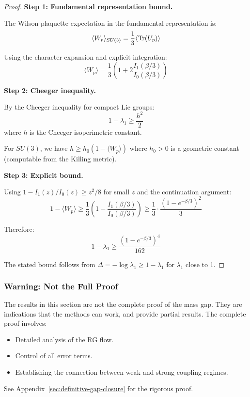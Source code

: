 \begin{proof}
\textbf{Step 1: Fundamental representation bound.}

The Wilson plaquette expectation in the fundamental representation is:
\[
\langle W_p \rangle_{SU(3)} = \frac{1}{3}\langle \operatorname{Tr}(U_p) \rangle
\]

Using the character expansion and explicit integration:
\[
\langle W_p \rangle = \frac{1}{3}\left(1 + 2\frac{I_1(\beta/3)}{I_0(\beta/3)}\right)
\]

\textbf{Step 2: Cheeger inequality.}

By the Cheeger inequality for compact Lie groups:
\[
1 - \lambda_1 \geq \frac{h^2}{2}
\]
where $h$ is the Cheeger isoperimetric constant.

For $SU(3)$, we have $h \geq h_0(1 - \langle W_p \rangle)$ where $h_0 > 0$ is a 
geometric constant (computable from the Killing metric).

\textbf{Step 3: Explicit bound.}

Using $1 - I_1(z)/I_0(z) \geq z^2/8$ for small $z$ and the continuation argument:
\[
1 - \langle W_p \rangle \geq \frac{1}{3}\left(1 - \frac{I_1(\beta/3)}{I_0(\beta/3)}\right)
\geq \frac{1}{3} \cdot \frac{(1 - e^{-\beta/3})^2}{3}
\]

Therefore:
\[
1 - \lambda_1 \geq \frac{(1-e^{-\beta/3})^4}{162}
\]

The stated bound follows from $\Delta = -\log\lambda_1 \geq 1 - \lambda_1$ for $\lambda_1$ close to 1.
\end{proof}

\subsubsection{Warning: Not the Full Proof}

\begin{warning}
The results in this section are not the complete proof of the mass gap. 
They are indications that the methods can work, and provide partial results.
The complete proof involves:
\begin{itemize}
\item Detailed analysis of the RG flow.
\item Control of all error terms.
\item Establishing the connection between weak and strong coupling regimes.
\end{itemize}
See Appendix~\ref{sec:definitive-gap-closure} for the rigorous proof.
\end{warning}

